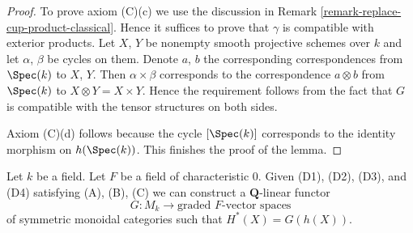 \begin{proof}
\medskip\noindent
To prove axiom (C)(c) we use the discussion in
Remark \ref{remark-replace-cup-product-classical}.
Hence it suffices to prove that $\gamma$ is compatible with
exterior products. Let $X$, $Y$ be nonempty smooth projective
schemes over $k$ and let $\alpha$, $\beta$ be cycles on them. Denote
$a$, $b$ the corresponding correspondences from $\Spec(k)$ to
$X$, $Y$. Then $\alpha \times \beta$ corresponds to the
correspondence $a \otimes b$ from $\Spec(k)$ to $X \otimes Y = X \times Y$.
Hence the requirement follows from the fact that $G$ is
compatible with the tensor structures on both sides.

\medskip\noindent
Axiom (C)(d) follows because the cycle $[\Spec(k)]$
corresponds to the identity morphism on $h(\Spec(k))$.
This finishes the proof of the lemma.
\end{proof}

\begin{lemma}
\label{lemma-from-weil-to-functor}
Let $k$ be a field. Let $F$ be a field of characteristic $0$. Given
(D1), (D2), (D3), and (D4) satisfying (A), (B), (C)
we can construct a $\mathbf{Q}$-linear functor
$$
G : M_k \longrightarrow \text{graded }F\text{-vector spaces}
$$
of symmetric monoidal categories such that $H^*(X) = G(h(X))$.
\end{lemma}


